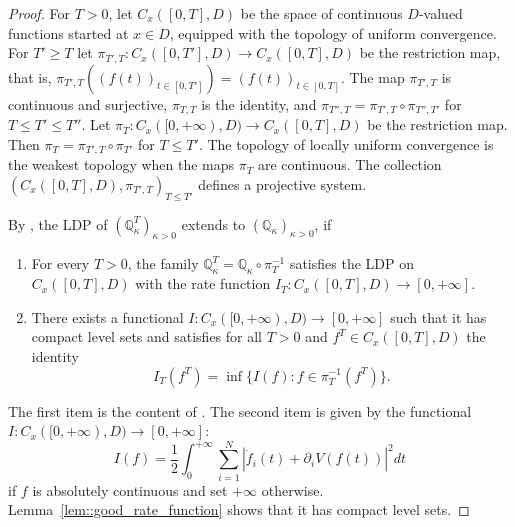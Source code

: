 \documentclass[11pt]{article}
\numberwithin{equation}{section}
\theoremstyle{definition}
\begin{document}
\begin{proof}
For $T>0$, let $C_{x}([0,T],D)$ be the space of continuous $D$-valued functions started at $x\in D$, equipped with the topology of uniform convergence. For $T'\ge T$ let $\pi_{T',T}:C_{x}([0,T'],D)\to C_{x}([0,T],D)$ be the restriction map, that is, $\pi_{T',T}((f(t))_{t\in [0,T']}) = (f(t))_{t\in [0,T]}$. The map $\pi_{T',T}$ is continuous and surjective, $\pi_{T,T}$ is the identity, and $\pi_{T'',T} = \pi_{T',T}\circ\pi_{T'',T'}$ for $T\le T'\le T''$. Let $\pi_{T}:C_{x}([0,+\infty),D) \to C_{x}([0,T],D)$ be the restriction map. Then $\pi_{T} = \pi_{T',T}\circ\pi_{T'}$ for $T\le T'$. The topology of locally uniform convergence is the weakest topology when the maps $\pi_{T}$ are continuous. The collection $(C_{x}([0,T],D), \pi_{T', T})_{T\le T'}$ defines a projective system.

By \cite[Theorem 4]{de1997exponential}, the LDP of $(\mathbb{Q}_{\kappa}^{T})_{\kappa>0}$ extends to $(\mathbb{Q}_{\kappa})_{\kappa>0}$, if
\begin{enumerate}
\item For every $T>0$, the family $\mathbb{Q}_{\kappa}^{T} = \mathbb{Q}_{\kappa}\circ \pi_{T}^{-1}$ satisfies the LDP on $C_{x}([0,T],D)$ with the rate function $I_{T}:C_{x}([0,T],D)\to [0,+\infty]$.
\item There exists a functional $I: C_{x}([0,+\infty),D)\to [0,+\infty]$ such that it has compact level sets and satisfies for all $T>0$ and $f^{T}\in C_{x}([0,T],D)$ the identity 
\[
    I_{T}(f^{T}) = \inf\{I(f): f\in \pi_{T}^{-1}(f^{T})\}.
\]
\end{enumerate}
The first item is the content of \cite[Theorem 1.8]{abuzaid2024large}. The second item is given by the functional $I:C_{x}([0,+\infty),D)\to[0,+\infty]$:
\[
    I(f) = \frac{1}{2}\int_{0}^{+\infty}\sum\limits_{i=1}^{N}\left|\dot f_{i}(t) + \partial_{i} V(f(t))\right|^2dt
\]
if $f$ is absolutely continuous and set $+\infty$ otherwise. Lemma~\ref{lem::good_rate_function} shows that it has compact level sets. 


\end{proof}
\end{document}
